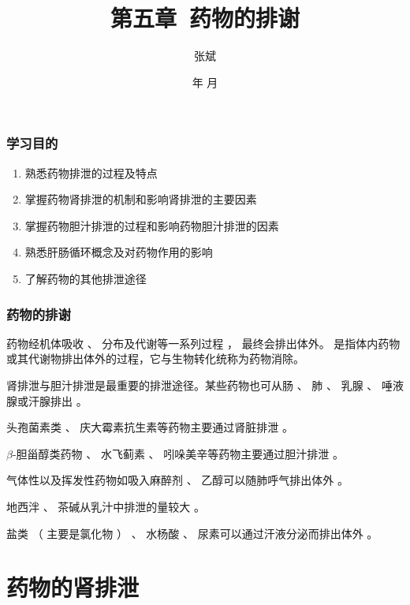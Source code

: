 \documentclass[dvipsnames, svgnames, x11names]{beamer}
\title{第五章\ 药物的排谢}
\author{张斌}
\institute[理工系]{河北农业大学 理工系}
\date{\the\year 年 \the\month 月}
\begin{document}
	
	\begin{frame}
		\titlepage
		\thispagestyle{empty}
		\addtocounter{framenumber}{-1}
	\end{frame}


\begin{frame}
    \frametitle{学习目的}
    \begin{enumerate}
      \item 熟悉药物排泄的过程及特点
      \item 掌握药物肾排泄的机制和影响肾排泄的主要因素
      \item 掌握药物胆汁排泄的过程和影响药物胆汁排泄的因素
      \item 熟悉肝肠循环概念及对药物作用的影响
      \item 了解药物的其他排泄途径
    \end{enumerate}
\end{frame}

\begin{frame}
    \frametitle{药物的排谢}
    药物经机体吸收 、 分布及代谢等一系列过程 ， 最终会排出体外。 是指体内药物或其代谢物排出体外的过程，它与生物转化统称为药物消除。
    
    肾排泄与胆汁排泄是最重要的排泄途径。某些药物也可从肠 、 肺 、 乳腺 、 唾液腺或汗腺排出 。
    \begin{blankblock}{}
        头孢菌素类 、 庆大霉素抗生素等药物主要通过肾脏排泄 。
        
        $\beta$-胆甾醇类药物 、 水飞蓟素 、 吲哚美辛等药物主要通过胆汁排泄 。
        
        气体性以及挥发性药物如吸入麻醉剂 、 乙醇可以随肺呼气排出体外 。
        
        地西泮 、 茶碱从乳汁中排泄的量较大 。
        
        盐类 （ 主要是氯化物 ） 、 水杨酸 、 尿素可以通过汗液分泌而排出体外 。
    \end{blankblock}
    
\end{frame}


\begin{frame}{}
	\begin{center}
		{\Huge {}}
	\end{center}
	\tableofcontents[subsectionstyle=hide/hide/show]
	\thispagestyle{empty}
	\addtocounter{framenumber}{-1}
\end{frame}


\section{药物的肾排泄}
\end{document}
